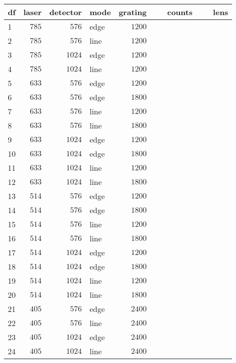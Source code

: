 %
\begin{table}[!tbp]
 \begin{center}
 \begin{tabular}{lrrlrll}\hline\hline
\multicolumn{1}{l}{df}&
\multicolumn{1}{c}{laser}&
\multicolumn{1}{c}{detector}&
\multicolumn{1}{c}{mode}&
\multicolumn{1}{c}{grating}&
\multicolumn{1}{c}{counts}&
\multicolumn{1}{c}{lens}
\tabularnewline \hline
1&$785$&$ 576$&edge&$1200$&~~~~~~~~~~~~~&\tabularnewline
2&$785$&$ 576$&line&$1200$&~~~~~~~~~~~~~&\tabularnewline
3&$785$&$1024$&edge&$1200$&~~~~~~~~~~~~~&\tabularnewline
4&$785$&$1024$&line&$1200$&~~~~~~~~~~~~~&\tabularnewline
5&$633$&$ 576$&edge&$1200$&~~~~~~~~~~~~~&\tabularnewline
6&$633$&$ 576$&edge&$1800$&~~~~~~~~~~~~~&\tabularnewline
7&$633$&$ 576$&line&$1200$&~~~~~~~~~~~~~&\tabularnewline
8&$633$&$ 576$&line&$1800$&~~~~~~~~~~~~~&\tabularnewline
9&$633$&$1024$&edge&$1200$&~~~~~~~~~~~~~&\tabularnewline
10&$633$&$1024$&edge&$1800$&~~~~~~~~~~~~~&\tabularnewline
11&$633$&$1024$&line&$1200$&~~~~~~~~~~~~~&\tabularnewline
12&$633$&$1024$&line&$1800$&~~~~~~~~~~~~~&\tabularnewline
13&$514$&$ 576$&edge&$1200$&~~~~~~~~~~~~~&\tabularnewline
14&$514$&$ 576$&edge&$1800$&~~~~~~~~~~~~~&\tabularnewline
15&$514$&$ 576$&line&$1200$&~~~~~~~~~~~~~&\tabularnewline
16&$514$&$ 576$&line&$1800$&~~~~~~~~~~~~~&\tabularnewline
17&$514$&$1024$&edge&$1200$&~~~~~~~~~~~~~&\tabularnewline
18&$514$&$1024$&edge&$1800$&~~~~~~~~~~~~~&\tabularnewline
19&$514$&$1024$&line&$1200$&~~~~~~~~~~~~~&\tabularnewline
20&$514$&$1024$&line&$1800$&~~~~~~~~~~~~~&\tabularnewline
21&$405$&$ 576$&edge&$2400$&~~~~~~~~~~~~~&\tabularnewline
22&$405$&$ 576$&line&$2400$&~~~~~~~~~~~~~&\tabularnewline
23&$405$&$1024$&edge&$2400$&~~~~~~~~~~~~~&\tabularnewline
24&$405$&$1024$&line&$2400$&~~~~~~~~~~~~~&\tabularnewline
\hline
\end{tabular}

\end{center}

\end{table}

